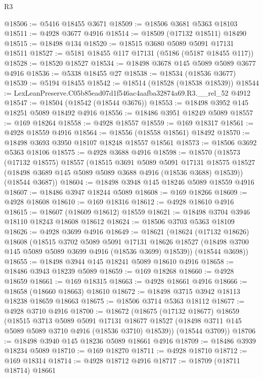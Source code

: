 \begin{lexlean}{R3}
\begin{coremodule}
@18506 := @5416 @18455 @3671
@18509 := @18506 @3681 @5363 @18103
@18511 := @4928 @3677 @4916
@18514 := @18509 (@17132 @18511) @18490
@18515 := @18498 @134
@18520 := @18515 @3680 @5089 @5091 @17131 @18511
@18527 := @5181 @18455 @117 @17131 (@5186 (@5187 @18455 @117))
@18528 := @18520 @18527
@18534 := @18498 @3678 @145 @5089 @5089 @3677 @4916
@18536 := @5338 @18455 @27
@18538 := @18534 (@18536 @3677)
@18539 := @5194 @18455
@18542 := @18514 (@18528 (@18538 @18539))
@18544 := LexLeanPreserve.C05b85ead07d1f546ac4aafba32874a69.R3.__rel_52 @4912
@18547 := @18504 (@18542 (@18544 @3676))
@18553 := @18498 @3952 @145 @18251 @5089 @18492 @4916
@18556 := @18486 @3951 @18249 @5089
@18557 := @169 @18264
@18558 := @4928 @18557
@18559 := @169 @18317
@18561 := @4928 @18559 @4916
@18564 := @18556 (@18558 @18561) @18492
@18570 := @18498 @3693 @3950 @18107 @18248 @18557 @18561
@18573 := @18506 @3692 @5363 @18106
@18575 := @4928 @3688 @4916
@18598 := @18570
    (@18573
      (@17132 @18575)
      @18557
      (@18515
        @3691
        @5089
        @5091
        @17131
        @18575
        @18527
        (@18498 @3689 @145 @5089 @5089 @3688 @4916 (@18536 @3688) @18539))
      (@18544 @3687))
@18604 := @18498 @3948 @145 @18246 @5089 @18559 @4916
@18607 := @18486 @3947 @18244 @5089
@18608 := @169 @18266
@18609 := @4928 @18608
@18610 := @169 @18316
@18612 := @4928 @18610 @4916
@18615 := @18607 (@18609 @18612) @18559
@18621 := @18498 @3704 @3946 @18110 @18243 @18608 @18612
@18624 := @18506 @3703 @5363 @18109
@18626 := @4928 @3699 @4916
@18649 := @18621
    (@18624
      (@17132 @18626)
      @18608
      (@18515
        @3702
        @5089
        @5091
        @17131
        @18626
        @18527
        (@18498 @3700 @145 @5089 @5089 @3699 @4916 (@18536 @3699) @18539))
      (@18544 @3698))
@18655 := @18498 @3944 @145 @18241 @5089 @18610 @4916
@18658 := @18486 @3943 @18239 @5089
@18659 := @169 @18268
@18660 := @4928 @18659
@18661 := @169 @18315
@18663 := @4928 @18661 @4916
@18666 := @18658 (@18660 @18663) @18610
@18672 := @18498 @3715 @3942 @18113 @18238 @18659 @18663
@18675 := @18506 @3714 @5363 @18112
@18677 := @4928 @3710 @4916
@18700 := @18672
    (@18675
      (@17132 @18677)
      @18659
      (@18515
        @3713
        @5089
        @5091
        @17131
        @18677
        @18527
        (@18498 @3711 @145 @5089 @5089 @3710 @4916 (@18536 @3710) @18539))
      (@18544 @3709))
@18706 := @18498 @3940 @145 @18236 @5089 @18661 @4916
@18709 := @18486 @3939 @18234 @5089
@18710 := @169 @18270
@18711 := @4928 @18710
@18712 := @169 @18314
@18714 := @4928 @18712 @4916
@18717 := @18709 (@18711 @18714) @18661

\end{coremodule}
\end{lexlean}
